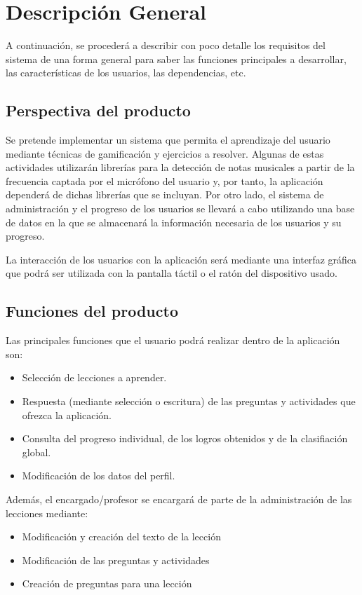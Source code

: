 \section{Descripción General}
A continuación, se procederá a describir con poco detalle los requisitos del sistema de una forma general para saber las funciones principales a desarrollar, las características de los usuarios, las dependencias, etc.
\subsection{Perspectiva del producto}
Se pretende implementar un sistema que permita el aprendizaje del usuario mediante técnicas de gamificación y ejercicios a resolver. Algunas de estas actividades utilizarán librerías para la detección de notas musicales
a partir de la frecuencia captada por el micrófono del usuario y, por tanto, la aplicación dependerá de dichas librerías que se incluyan.
Por otro lado, el sistema de administración y el progreso de los usuarios se llevará a cabo utilizando una base de datos en la que se almacenará la información necesaria de los usuarios y su progreso.

La interacción de los usuarios con la aplicación será mediante una interfaz gráfica que podrá ser utilizada con la pantalla táctil o el ratón del dispositivo usado.

\subsection{Funciones del producto}
Las principales funciones que el usuario podrá realizar dentro de la aplicación son:
\begin{itemize}
\item Selección de lecciones a aprender.
\item Respuesta (mediante selección o escritura) de las preguntas y actividades que ofrezca la aplicación.
\item Consulta del progreso individual, de los logros obtenidos y de la clasifiación global.
\item Modificación de los datos del perfil.
\end {itemize}

Además, el encargado/profesor se encargará de parte de la administración de las lecciones mediante:
\begin{itemize}
    \item Modificación y creación del texto de la lección
    \item Modificación de las preguntas y actividades
    \item Creación de preguntas para una lección
\end{itemize}


